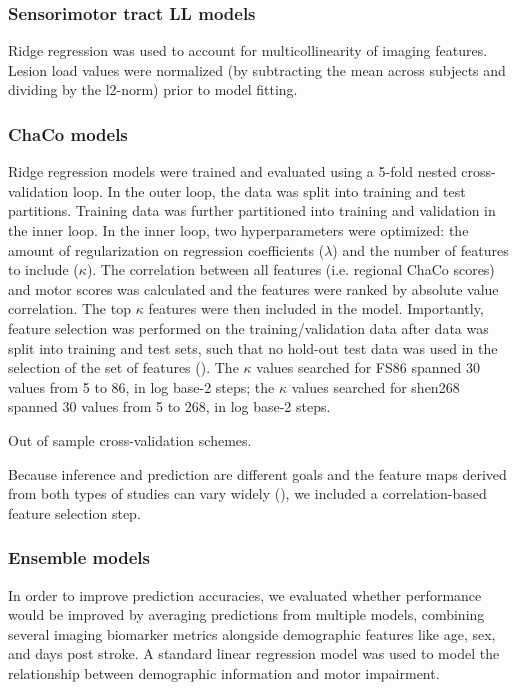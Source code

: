 \documentclass[10pt]{article}
\begin{document}
\subsubsection*{Sensorimotor tract LL models}
Ridge regression was used to account for multicollinearity of imaging features. Lesion load values were normalized (by subtracting the mean across subjects and dividing by the l2-norm) prior to model fitting.

\subsubsection*{ChaCo models}

Ridge regression models were trained and evaluated using a 5-fold nested cross-validation loop. In the outer loop, the data was split into training and test partitions. Training data was further partitioned into training and validation in the inner loop. In the inner loop, two hyperparameters were optimized: the amount of regularization on regression coefficients ($\lambda$) and the number of features to include ($\kappa$). The correlation between all features (i.e. regional ChaCo scores) and motor scores was calculated and the features were ranked by absolute value correlation. The top $\kappa$ features were then included in the model. Importantly, feature selection was performed on the training/validation data after data was split into training and test sets, such that no hold-out test data was used in the selection of the set of features (\cite{Hastie2001-or}). The $\kappa$ values searched for FS86 spanned 30 values from 5 to 86, in log base-2 steps; the $\kappa$ values searched for shen268 spanned 30 values from 5 to 268, in log base-2 steps. 

Out of sample cross-validation schemes.

Because inference and prediction are different goals and the feature maps derived from both types of studies can vary widely (\cite{Sperber2021-lw, Bzdok2020-py}), we included a correlation-based feature selection step. 


\subsubsection*{Ensemble models}
In order to improve prediction accuracies, we evaluated whether performance would be improved by averaging predictions from multiple models, combining several imaging biomarker metrics alongside demographic features like age, sex, and days post stroke. A standard linear regression model was used to model the relationship between demographic information and motor impairment. 
\end{document}
